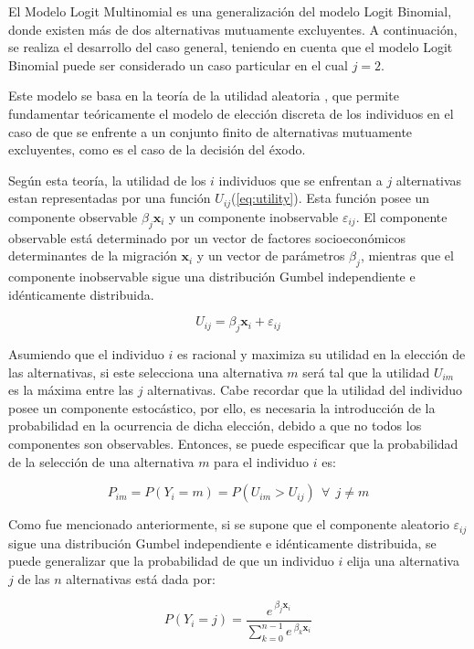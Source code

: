 \documentclass[12pt,a4paper]{article}
\begin{document}
El Modelo Logit Multinomial es una generalización del modelo Logit Binomial, donde existen más de dos alternativas mutuamente excluyentes. A continuación, se realiza el desarrollo del caso general, teniendo en cuenta que el modelo Logit Binomial puede ser considerado un caso particular en el cual $j=2$.

Este modelo se basa en la teoría de la utilidad aleatoria \parencite{domencich_urban_1975}, que permite fundamentar teóricamente el modelo de elección discreta de los individuos en el caso de que se enfrente a un conjunto finito de alternativas mutuamente excluyentes, como es el caso de la decisión del éxodo.

Según esta teoría, la utilidad de los $i$ individuos que se enfrentan a $j$ alternativas estan representadas por una función $U_{ij}$(\ref{eq:utility}). Esta función posee un componente observable $\beta_{j} \textbf{x}_{i}$ y un componente inobservable $\varepsilon_{ij}$. El componente observable está determinado por un vector de factores socioeconómicos determinantes de la migración $\textbf{x}_{i}$ y un vector de parámetros $\beta_{j}$, mientras que el componente inobservable sigue una distribución  Gumbel independiente e idénticamente distribuida.
\begin {center}
\begin{equation}\label{eq:utility}
U_{ij}=\beta_{j} \textbf{x}_{i}+\varepsilon_{ij}
\end{equation}
\end {center}

Asumiendo que el individuo $i$ es racional y maximiza su utilidad en la elección de las  alternativas, si este selecciona una alternativa $m$ será tal que la utilidad $U_{im}$ es la máxima entre las $j$ alternativas. Cabe recordar que la utilidad del individuo posee un componente estocástico, por ello, es necesaria la introducción de la probabilidad en la ocurrencia de dicha elección, debido a que no todos los componentes son observables. Entonces, se puede especificar que  la probabilidad de la selección de una alternativa $m$ para el individuo $i$ es:
\begin {center}
\begin{equation}\label{eq:prob}
P_{im}=P{(Y_{i}=m)} =P(U_{im}>U_{ij}) \ \ \forall \ \ j\neq m
\end{equation}
\end {center}

Como fue mencionado anteriormente, si se supone que el componente aleatorio $\varepsilon_{ij}$ sigue una distribución Gumbel independiente e idénticamente distribuida, se puede generalizar que la probabilidad de que un individuo $i$ elija una alternativa $j$ de las $n$ alternativas está dada por:
\begin {center}
\begin{equation}\label{eq:multinom}
P{(Y_{i}=j)}=\frac{e^{\ \beta_{j} \textbf{x}_{i}}}{\sum_{k=0}^{n-1}e^{\ \beta_{k} \textbf{x}_{i}}}
\end{equation}
\end {center}
\end{document}
